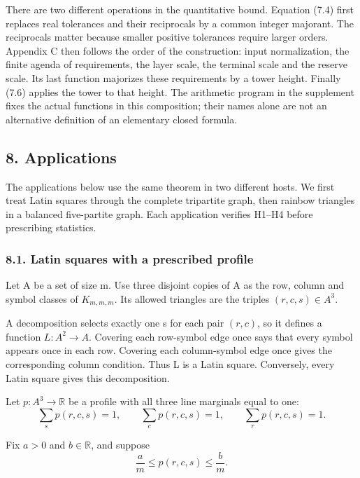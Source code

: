 \documentclass[english,11pt,a4paper]{article}
\begin{document}
There are two different operations in the quantitative bound. Equation (7.4) first replaces real tolerances and their reciprocals by a common integer majorant. The reciprocals matter because smaller positive tolerances require larger orders. Appendix C then follows the order of the construction: input normalization, the finite agenda of requirements, the layer scale, the terminal scale and the reserve scale. Its last function majorizes these requirements by a tower height. Finally (7.6) applies the tower to that height. The arithmetic program in the supplement fixes the actual functions in this composition; their names alone are not an alternative definition of an elementary closed formula.

\subsection{8. Applications}\label{applications}

The applications below use the same theorem in two different hosts. We first treat Latin squares through the complete tripartite graph, then rainbow triangles in a balanced five-partite graph. Each application verifies H1--H4 before prescribing statistics.

\subsubsection{8.1. Latin squares with a prescribed profile}\label{latin-squares-with-a-prescribed-profile}

Let A be a set of size m. Use three disjoint copies of A as the row, column and symbol classes of \(K_{m,m,m}\). Its allowed triangles are the triples \((r,c,s)\in A^3\).

A decomposition selects exactly one s for each pair \((r,c)\), so it defines a function \(L:A^2\to A\). Covering each row-symbol edge once says that every symbol appears once in each row. Covering each column-symbol edge once gives the corresponding column condition. Thus L is a Latin square. Conversely, every Latin square gives this decomposition.

Let \(p:A^3\to\mathbb R\) be a profile with all three line marginals equal to one:
\[\sum_s p(r,c,s)=1,\qquad
\sum_c p(r,c,s)=1,\qquad
\sum_r p(r,c,s)=1.                                                  \tag{8.1}\]

Fix \(a>0\) and \(b\in\mathbb R\), and suppose
\[\frac a m\leq p(r,c,s)\leq\frac b m.                               \tag{8.2}\]
\end{document}
